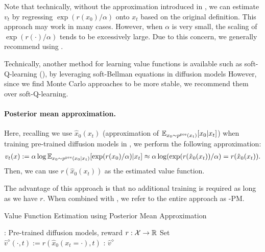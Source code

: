 Note that technically, without the approximation introduced in , we can estimate $v_t$ by regressing $\exp(r(x_0)/\alpha)$ onto $x_t$ based on the original definition. This approach may work in many cases. However, when $\alpha$ is very small, the scaling of $\exp(r(\cdot)/\alpha)$ tends to be excessively large. Due to this concern, we generally recommend using . 



\begin{remark}
Technically, another method for learning value functions is available such as soft-Q-learning (), by leveraging soft-Bellman equations in diffusion models \citet[Section 3]{uehara2024understanding} 
However, since we find Monte Carlo approaches to be more stable, we recommend them over soft-Q-learning. 
\end{remark}

\vspace{-2mm}
\paragraph{Posterior mean approximation. }
Here, recalling we use $\hat x_0(x_t)$ (approximation of $\mathbb{E}_{x_0\sim p^{\mathrm{pre}}(x_t)}[x_0|x_t]$) when training pre-trained diffusion models in , we perform the following approximation:
\begin{align*}
     v_t(x):= \alpha \log \mathbb{E}_{x_0\sim p^{\mathrm{pre}}(x_0|x_t)}[\exp(r(x_0)/\alpha)|x_t] \approx \alpha \log (\exp(r(\hat x_0(x_t))/\alpha)= r(\hat x_0(x_t)). 
\end{align*}
Then, we can use $r(\hat x_0(x_t))$ as the estimated value function. 

The advantage of this approach is that no additional training is required as long as we have $r$. When combined with , we refer to the entire approach as \alg-PM. 

\begin{algorithm}[!th]
\caption{Value Function Estimation using Posterior Mean Approximation}\label{alg:PM}
\begin{algorithmic}[1]
     :  Pre-trained diffusion models, reward $r:\mathcal{X} \to \mathbb{R}$
    \STATE  Set $\hat v^{\diamond}(\cdot,t):= r(\hat x_0(x_t=\cdot),t)$ 
      : $ \hat v^{\diamond}$
\end{algorithmic}
\end{algorithm}

